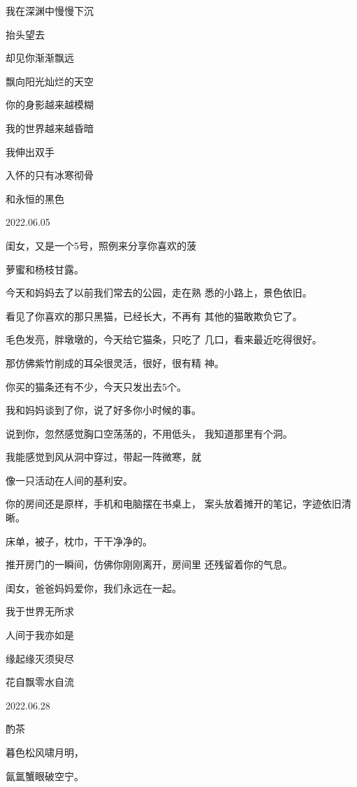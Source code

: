 \documentclass{article}
\begin{document}
我在深渊中慢慢下沉 

\newpage


抬头望去 


却见你渐渐飘远 


飘向阳光灿烂的天空 


你的身影越来越模糊 


我的世界越来越昏暗 


我伸出双手 


入怀的只有冰寒彻骨 


和永恒的黑色 



2022.06.05 

闺女，又是一个5号，照例来分享你喜欢的菠

\newpage
萝蜜和杨枝甘露。 

今天和妈妈去了以前我们常去的公园，走在熟
悉的小路上，景色依旧。 

看见了你喜欢的那只黑猫，已经长大，不再有
其他的猫敢欺负它了。 

毛色发亮，胖墩墩的，今天给它猫条，只吃了
几口，看来最近吃得很好。 

那仿佛紫竹削成的耳朵很灵活，很好，很有精
神。 


你买的猫条还有不少，今天只发出去5个。 

我和妈妈谈到了你，说了好多你小时候的事。

说到你，忽然感觉胸口空荡荡的，不用低头，
我知道那里有个洞。 

我能感觉到风从洞中穿过，带起一阵微寒，就
\newpage

像一只活动在人间的基利安。 

你的房间还是原样，手机和电脑摆在书桌上，
案头放着摊开的笔记，字迹依旧清晰。 


床单，被子，枕巾，干干净净的。 

推开房门的一瞬间，仿佛你刚刚离开，房间里
还残留着你的气息。 


闺女，爸爸妈妈爱你，我们永远在一起。 



我于世界无所求 


人间于我亦如是 


缘起缘灭须臾尽 


花自飘零水自流 

\newpage



2022.06.28 



酌茶 


暮色松风啸月明， 


氤氲蟹眼破空宁。 
\end{document}

